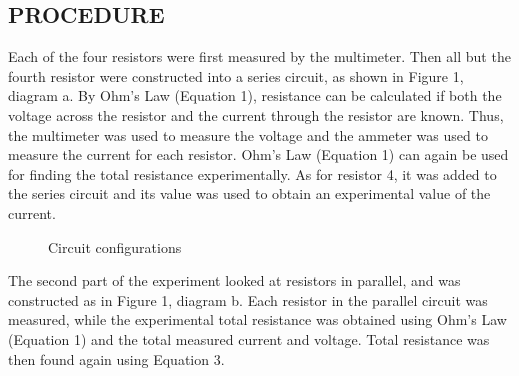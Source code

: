 \documentclass [12pt, letterpaper, twoside] {article}
\begin{document}
\subsection* {PROCEDURE}
Each of the four resistors were first measured by the multimeter. Then all but the fourth resistor were constructed into a series circuit, as shown in Figure 1, diagram a. By Ohm's Law (Equation 1), resistance can be calculated if both the voltage across the resistor and the current through the resistor are known. Thus, the multimeter was used to measure the voltage and the ammeter was used to measure the current for each resistor. Ohm's Law (Equation 1) can again be used for finding the total resistance experimentally. As for resistor 4, it was added to the series circuit and its value was used to obtain an experimental value of the current.

\begin{figure}
  \centering
  \qquad
  \qquad
  \caption{Circuit configurations}
\end{figure}

The second part of the experiment looked at resistors in parallel, and was constructed as in Figure 1, diagram b. Each resistor in the parallel circuit was measured, while the experimental total resistance was obtained using Ohm's Law (Equation 1) and the total measured current and voltage. Total resistance was then found again using Equation 3.
\end{document}
